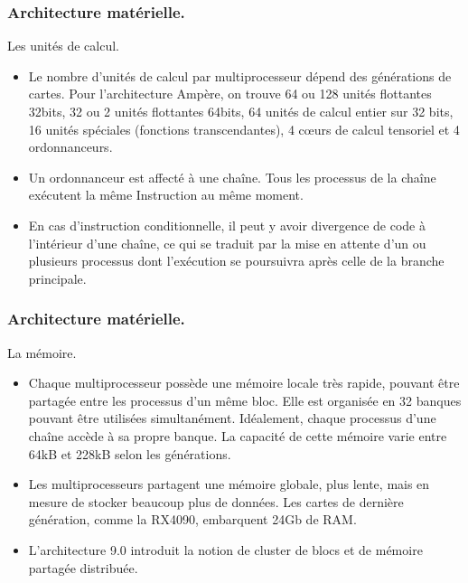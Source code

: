 \begin{frame}
    \frametitle{Architecture matérielle.}
\begin{block}{Les unités de calcul.}
   \begin{itemize}
    \item<+-> Le nombre d'unités de calcul par multiprocesseur dépend des générations de cartes. Pour l'architecture 
    Ampère, on trouve 64 ou 128 unités flottantes 32bits, 32 ou 2 unités flottantes 64bits, 64 unités de calcul entier
    sur 32 bits, 16 unités spéciales (fonctions transcendantes), 4 cœurs de calcul tensoriel et 4 ordonnanceurs.
    \item<+-> Un ordonnanceur est affecté à une chaîne. Tous les processus de la chaîne exécutent la même Instruction
    au même moment.
    \item<+-> En cas d'instruction conditionnelle, il peut y avoir divergence de code à l'intérieur d'une chaîne, ce qui se traduit par la 
    mise en attente d'un ou plusieurs processus dont l'exécution se poursuivra après celle de la branche principale. 
   \end{itemize} 
\end{block}
\end{frame}
\begin{frame}
    \frametitle{Architecture matérielle.}
\begin{block}{La mémoire.}
   \begin{itemize}
    \item<+-> Chaque multiprocesseur possède une mémoire locale très rapide, pouvant être partagée entre les processus
    d'un même bloc. Elle est organisée en 32 banques pouvant être utilisées simultanément. Idéalement, 
    chaque processus d'une chaîne accède à sa propre banque. La capacité de cette mémoire varie entre 64kB et 228kB 
    selon les générations.
    \item<+-> Les multiprocesseurs partagent une mémoire globale, plus lente, mais en mesure de stocker beaucoup plus 
    de données. Les cartes de dernière génération, comme la RX4090, embarquent 24Gb de RAM.
    \item<+-> L'architecture 9.0 introduit la notion de cluster de blocs et de mémoire partagée distribuée.
   \end{itemize} 
\end{block}
\end{frame}
